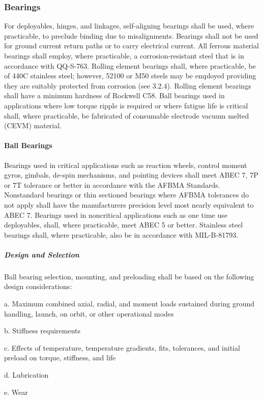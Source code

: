 \documentclass[12pt]{article}
\begin{document}
\subsubsection{Bearings} %
For deployables, hinges, and linkages, self-aligning bearings shall be used, where practicable, to preclude binding due to misalignments. 
Bearings shall not be used for ground current return paths or to carry electrical current. 
All ferrous material bearings shall employ, where practicable, a corrosion-resistant steel that is in accordance with QQ-S-763. 
Rolling element bearings shall, where practicable, be of 440C stainless steel; however, 52100 or M50 steels may be employed providing they are suitably protected from corrosion (see 3.2.4). 
Rolling element bearings shall have a minimum hardness of Rockwell C58. 
Ball bearings used in applications where low torque ripple is required or where fatigue life is critical shall, where practicable, be fabricated of consumable electrode vacuum melted (CEVM) material.

\paragraph{Ball Bearings} %
Bearings used in critical applications such as reaction wheels, control moment gyros, gimbals, de-spin mechanisms, and pointing devices shall meet ABEC 7, 7P or 7T tolerance or better in accordance with the AFBMA Standards. 
Nonstandard bearings or thin sectioned bearings where AFBMA tolerances do not apply shall have the manufacturers precision level most nearly equivalent to ABEC 7.
Bearings used in noncritical applications such as one time use deployables, shall, where practicable, meet ABEC 5 or better.
Stainless steel bearings shall, where practicable, also be in accordance with MIL-B-81793.

\subparagraph{Design and Selection} %
Ball bearing selection, mounting, and preloading shall be based on the following design considerations:

a. Maximum combined axial, radial, and moment loads sustained during ground handling, launch, on orbit, or other operational modes

b. Stiffness requirements

c. Effects of temperature, temperature gradients, fits, tolerances, and initial preload on torque, stiffness, and life

d. Lubrication

e. Wear
\end{document}
